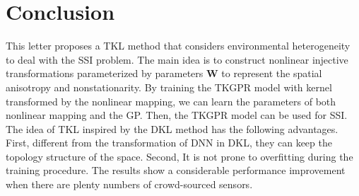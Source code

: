 \documentclass[journal, oneside, twocolumn]{IEEEtran}
\begin{document}
\section{Conclusion}
This letter proposes a TKL method that considers environmental heterogeneity to deal with the SSI problem. The main idea is to construct nonlinear injective transformations parameterized by parameters $\mathbf{W}$ to represent the spatial anisotropy and nonstationarity. By training the TKGPR model with kernel transformed by the nonlinear mapping, we can learn the parameters of both nonlinear mapping and the GP. Then, the TKGPR model can be used for SSI. The idea of TKL inspired by the DKL method has the following advantages. First, different from the transformation of DNN in DKL, they can keep the topology structure of the space.  Second, It is not prone to overfitting during the training procedure. The results show a considerable performance improvement when there are plenty numbers of crowd-sourced sensors.

\ifCLASSOPTIONcaptionsoff
  \newpage
\fi






\end{document}
